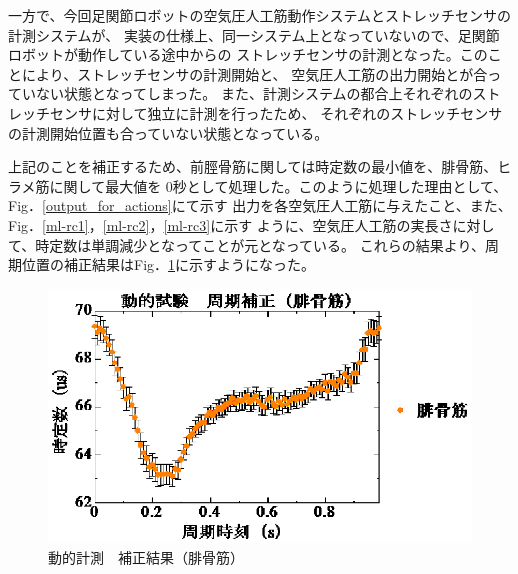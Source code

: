 一方で、今回足関節ロボットの空気圧人工筋動作システムとストレッチセンサの計測システムが、
実装の仕様上、同一システム上となっていないので、足関節ロボットが動作している途中からの
ストレッチセンサの計測となった。このことにより、ストレッチセンサの計測開始と、
空気圧人工筋の出力開始とが合っていない状態となってしまった。
また、計測システムの都合上それぞれのストレッチセンサに対して独立に計測を行ったため、
それぞれのストレッチセンサの計測開始位置も合っていない状態となっている。

上記のことを補正するため、前脛骨筋に関しては時定数の最小値を、腓骨筋、ヒラメ筋に関して最大値を
0秒として処理した。このように処理した理由として、Fig．\ref{output_for_actions}にて示す
出力を各空気圧人工筋に与えたこと、また、Fig．\ref{ml-rc1}，\ref{ml-rc2}，\ref{ml-rc3}に示す
ように、空気圧人工筋の実長さに対して、時定数は単調減少となってことが元となっている。
これらの結果より、周期位置の補正結果はFig．\ref{min-rc2}に示すようになった。
\begin{figure}[h]
    \begin{center}
        \includegraphics[width=0.7\columnwidth,clip]{4_consideration/min/hikotsu.eps}
    \end{center}
    \caption{動的計測　補正結果（腓骨筋）}
    \label{min-rc2}
\end{figure}
